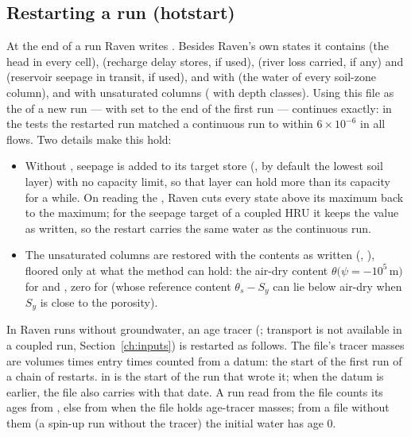 \subsection{Restarting a run (hotstart)}
At the end of a run Raven writes . Besides Raven's own states it contains  (the head in
every cell),  (recharge delay stores, if used),  (river loss carried, if any) and  (reservoir seepage in
transit, if used), and with   (the water of every soil-zone column), and with unsaturated columns  ( with depth classes). Using this file as the  of a new run --- with  set to the end of the first
run --- continues exactly: in the tests the restarted run matched a continuous run to within $6\times10^{-6}$ in all flows.
Two details make this hold:
\begin{itemize}
\item Without , seepage is added to its target store (, by default the
lowest soil layer) with no capacity limit, so that layer can hold more than its capacity for a while. On reading the
, Raven cuts every state above its maximum back to the maximum; for the seepage target of a coupled HRU it keeps
the value as written, so the restart carries the same water as the continuous run.
\item The unsaturated columns are restored with the contents as written (,
), floored only at what the method can hold: the air-dry content
$\theta(\psi=-10^5$\,m$)$ for  and , zero for  (whose reference content
$\theta_s-S_y$ can lie below air-dry when $S_y$ is close to the porosity).
\end{itemize}
In Raven runs without groundwater, an age tracer (; transport is not available in a coupled run,
Section~\ref{ch:inputs}) is restarted as follows. The file's tracer masses are volumes times entry times counted from a
datum: the start of the first run of a chain of restarts.  in  is the start of the run that
wrote it; when the datum is earlier, the file also carries  with that date. A run read from the file
counts its ages from , else from  when the file holds age-tracer masses; from a file
without them (a spin-up run without the tracer) the initial water has age 0.

